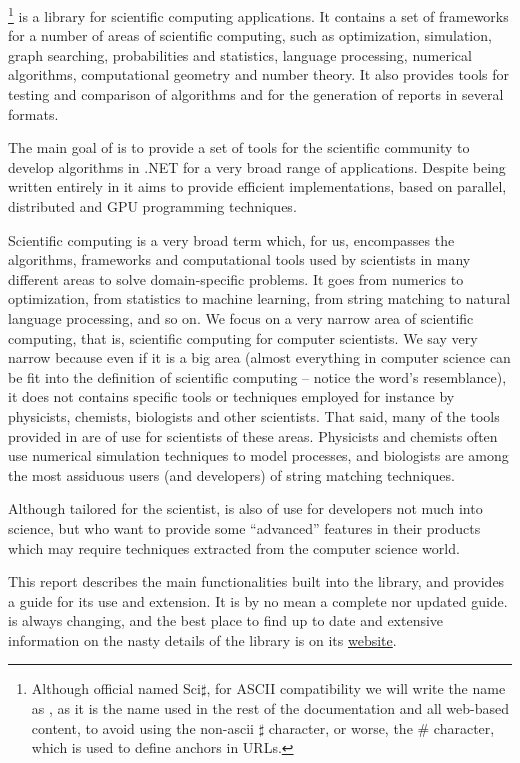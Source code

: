 \sct\footnote{Although official named Sci$\sharp$, for ASCII compatibility
we will write the name as \sct, as it is the name used in the
rest of the documentation and all web-based content, to avoid using
the non-ascii $\sharp$ character, or worse, the \# character, which
is used to define anchors in URLs.} is a \cs library for scientific computing applications.
It contains a set of frameworks for a number of areas of scientific
computing, such as optimization, simulation, graph searching, 
probabilities and statistics, language processing, numerical algorithms,
computational geometry and number theory. It also provides tools for
testing and comparison of algorithms and for the generation of 
reports in several formats.

The main goal of \sct is to provide a set of tools for
the scientific community to develop algorithms in .NET for 
a very broad range of applications. Despite
being written entirely in \cs it aims to provide efficient
implementations, based on parallel, distributed and GPU programming
techniques.

Scientific computing is a very broad term which, for us, encompasses
the algorithms, frameworks and computational tools used by scientists in 
many different areas to solve domain-specific problems. It goes
from numerics to optimization, from statistics to machine learning,
from string matching to natural language processing, and so on.
We focus on a very narrow area of scientific computing, that is,
scientific computing for computer scientists. We say very narrow because
even if it is a big area (almost everything in computer science can
be fit into the definition of scientific computing -- notice the
word's resemblance), it does not contains specific tools or
techniques employed for instance by physicists, chemists, biologists 
and other scientists. That said, many of the tools provided
in \sct are of use for scientists of these areas. Physicists and
chemists often use numerical simulation techniques to model
processes, and biologists are among the most assiduous users
(and developers) of string matching techniques.

Although tailored for the scientist, \sct is also of use
for developers not much into science, but who want to provide some
``advanced'' features in their products which may require
techniques extracted from the computer science world.

This report describes the main functionalities built into
the library, and provides a guide for its use and extension.
It is by no mean a complete nor updated guide. \sct
is always changing, and the best place to find up to date and
extensive information on the nasty details of the library
is on its \href{http://scisharp.github.com}{website}.

